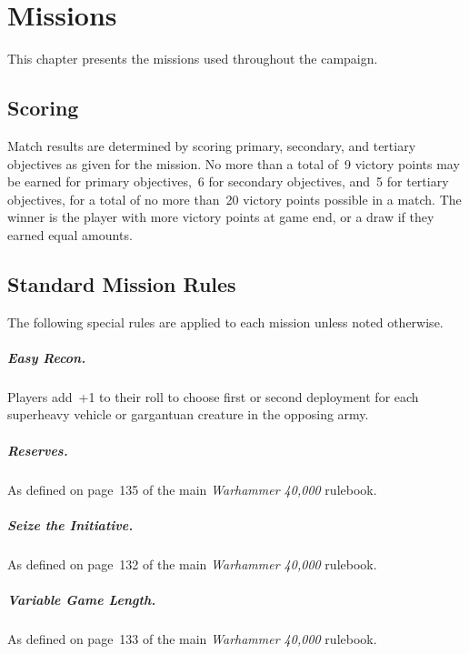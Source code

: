 \makeatletter\@openrightfalse
\chapter{Missions}
\@openrighttrue\makeatother

This chapter presents the missions used throughout the campaign.

\section{Scoring}

Match results are determined by scoring primary, secondary, and
tertiary objectives as given for the mission.  No more than a total
of~9 victory points may be earned for primary objectives,~6 for
secondary objectives, and~5 for tertiary objectives, for a total of no
more than~20 victory points possible in a match.  The winner is the
player with more victory points at game end, or a draw if they earned
equal amounts.
  
\section{Standard Mission Rules}

The following special rules are applied to each mission unless noted
otherwise.

\paragraph{Easy Recon.}  Players add~+1 to their roll to
choose first or second deployment for each superheavy vehicle or
gargantuan creature in the opposing army.

\paragraph{Reserves.} As defined on page~135 of the main
\emph{Warhammer 40,000} rulebook.

\paragraph{Seize the Initiative.} As defined on page~132 of
the main \emph{Warhammer 40,000} rulebook.

\paragraph{Variable Game Length.} As defined on page~133 of
the main \emph{Warhammer 40,000} rulebook.

